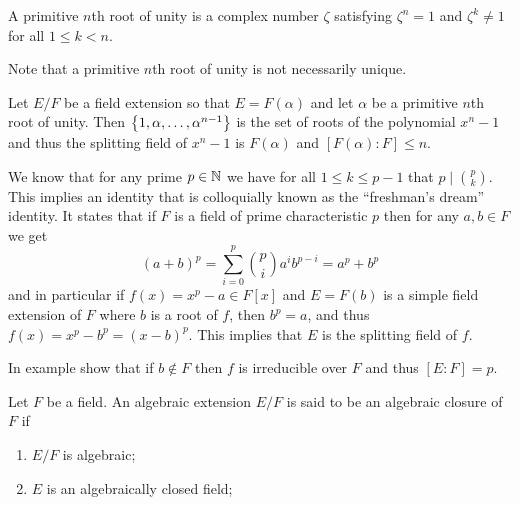 \documentclass[11pt,a4paper]{article}
\begin{document}
\begin{definition}
  A primitive $n$th root of unity is a complex number $\zeta$
  satisfying $\zeta^n = 1$ and $\zeta^k \neq 1$ for all $1 \le k < n$.
\end{definition}
\begin{remark}
  Note that a primitive $n$th root of unity is not necessarily unique.
\end{remark}

\begin{example}
  Let $E/F$ be a field extension so that $E = F(\alpha)$ and let $\alpha$
  be a primitive $n$th root of unity.
  Then $\left\{1,\alpha,\dots,\alpha^{n-1}\right\}$ is the set of roots
  of the polynomial $x^n - 1$ and thus the splitting field of $x^n - 1$
  is $F(\alpha)$ and $[F(\alpha) : F] \le n$.
\end{example}

\begin{example}
  \label{exmp:splitting-field-prime}
  We know that for any prime $p \in \mathbb{N}$ we have for all $1 \le k \le p - 1$
  that $p \mid \binom{p}{k}$.
  This implies an identity that is colloquially known as
  the ``freshman's dream'' identity.
  It states that if $F$ is a field of prime characteristic $p$
  then for any $a,b \in F$ we get
  \[
    (a + b)^{p} = \sum_{i=0}^{p} \binom{p}{i} a^{i} b^{p-i} = a^p + b^p
  \]
  and in particular if $f(x) = x^p - a \in F[x]$ and $E = F(b)$
  is a simple field extension of $F$ where $b$ is a root of $f$,
  then $b^p = a$, and thus $f(x) = x^p - b^p = (x - b)^p$.
  This implies that $E$ is the splitting field of $f$.
\end{example}

\begin{exercise}
  \label{ex:show-x-p-irreducible}
  In example 
  show that if $b \notin F$ then $f$ is irreducible over $F$
  and thus $[E : F] = p$.
\end{exercise}

\begin{definition}
  Let $F$ be a field.
  An algebraic extension $E/F$ is said to be an algebraic closure of $F$
  if
  \begin{enumerate}
    \item[(1)] $E/F$ is algebraic;
    \item[(2)] $E$ is an algebraically closed field;
  \end{enumerate}
\end{definition}
\end{document}
